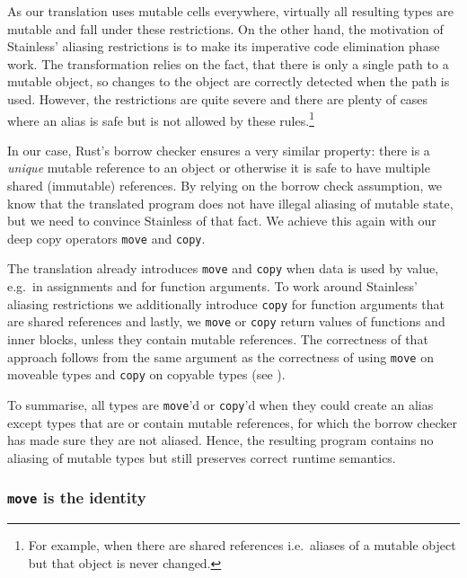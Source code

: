 As our translation uses mutable cells everywhere, virtually all
resulting types are mutable and fall under these restrictions. On the
other hand, the motivation of Stainless' aliasing restrictions is to
make its imperative code elimination phase work. \cite{regb} The
transformation relies on the fact, that there is only a single path to a
mutable object, so changes to the object are correctly detected when the
path is used. However, the restrictions are quite severe and there are
plenty of cases where an alias is safe but is not allowed by these
rules.\footnote{For example, when there are shared references i.e.~aliases of a
mutable object but that object is never changed.}

In our case, Rust's borrow checker ensures a very similar property:
there is a \emph{unique} mutable reference to an object or otherwise it
is safe to have multiple shared (immutable) references. By relying on
the borrow check assumption, we know that the translated program does
not have illegal aliasing of mutable state, but we need to convince
Stainless of that fact. We achieve this again with our deep copy
operators \passthrough{\lstinline!move!} and
\passthrough{\lstinline!copy!}.

The translation already introduces \passthrough{\lstinline!move!} and
\passthrough{\lstinline!copy!} when data is used by value, e.g.~in
assignments and for function arguments. To work around Stainless'
aliasing restrictions we additionally introduce
\passthrough{\lstinline!copy!} for function arguments that are shared
references and lastly, we \passthrough{\lstinline!move!} or
\passthrough{\lstinline!copy!} return values of functions and inner
blocks, unless they contain mutable references. The correctness of that
approach follows from the same argument as the correctness of using
\passthrough{\lstinline!move!} on moveable types and
\passthrough{\lstinline!copy!} on copyable types (see ).

To summarise, all types are \passthrough{\lstinline!move!}'d or
\passthrough{\lstinline!copy!}'d when they could create an alias except
types that are or contain mutable references, for which the borrow
checker has made sure they are not aliased. Hence, the resulting program
contains no aliasing of mutable types but still preserves correct
runtime semantics.

\subsubsection{\texorpdfstring{\texttt{move} is the
identity}{move is the identity}}

